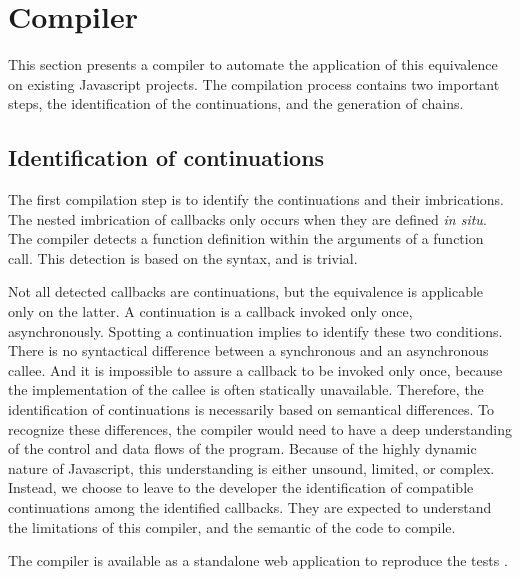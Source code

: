 \section{Compiler} \label{chapter5:compiler}

This section presents a compiler to automate the application of this equivalence on existing Javascript projects.
The compilation process contains two important steps, the identification of the continuations, and the generation of chains.

\subsection{Identification of continuations}

The first compilation step is to identify the continuations and their imbrications.
The nested imbrication of callbacks only occurs when they are defined \textit{in situ}.
The compiler detects a function definition within the arguments of a function call.
This detection is based on the syntax, and is trivial.


Not all detected callbacks are continuations, but the equivalence is applicable only on the latter.
A continuation is a callback invoked only once, asynchronously.
Spotting a continuation implies to identify these two conditions.
There is no syntactical difference between a synchronous and an asynchronous callee.
And it is impossible to assure a callback to be invoked only once, because the implementation of the callee is often statically unavailable.
Therefore, the identification of continuations is necessarily based on semantical differences.
To recognize these differences, the compiler would need to have a deep understanding of the control and data flows of the program.
Because of the highly dynamic nature of Javascript, this understanding is either unsound, limited, or complex.
Instead, we choose to leave to the developer the identification of compatible continuations among the identified callbacks.
They are expected to understand the limitations of this compiler, and the semantic of the code to compile.

The compiler is available as a standalone web application to reproduce the tests .

